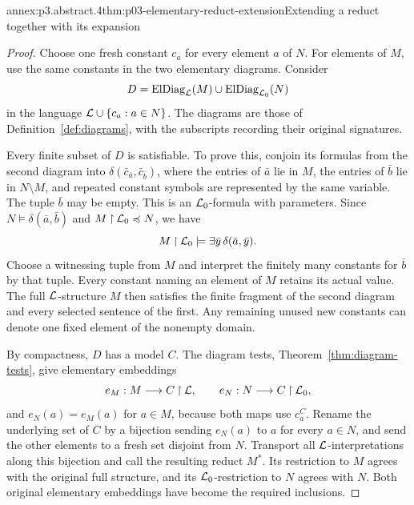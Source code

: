 \begin{annexitem}{annex:p3.abstract.4}{thm:p03-elementary-reduct-extension}{Extending a reduct together with its expansion}
\begin{proof}
Choose one fresh constant \(c_a\) for every element \(a\) of \(N\).
For elements of \(M\), use the same constants in the two elementary
diagrams.  Consider
\[
 D=\operatorname{ElDiag}_{\mathcal{L}}(M)
        \cup\operatorname{ElDiag}_{\mathcal{L}_0}(N)
\]
in the language \(\mathcal{L}\cup\{c_a:a\in N\}\).
The diagrams are those of Definition~\ref{def:diagrams}, with the
subscripts recording their original signatures.

Every finite subset of \(D\) is satisfiable.  To prove this, conjoin
its formulas from the second diagram into
\(\delta(\bar c_{\bar a},\bar c_{\bar b})\), where the entries of
\(\bar a\) lie in \(M\), the entries of \(\bar b\) lie in \(N\setminus M\),
and repeated constant symbols are represented by the same variable.
The tuple \(\bar b\) may be empty.
This is an \(\mathcal{L}_0\)-formula with parameters.
Since \(N\models\delta(\bar a,\bar b)\) and
\(M\mathbin{\upharpoonright}\mathcal{L}_0\preccurlyeq N\), we have
\[
 M\mathbin{\upharpoonright}\mathcal{L}_0\models\exists\bar y\,\delta(\bar a,\bar y).
\]
Choose a witnessing tuple from \(M\) and interpret the finitely many
constants for \(\bar b\) by that tuple.
Every constant naming an element of \(M\) retains its actual value.
The full \(\mathcal{L}\)-structure \(M\) then satisfies the finite fragment
of the second diagram and every selected sentence of the first.
Any remaining unused new constants can denote one fixed element of
the nonempty domain.

By compactness, \(D\) has a model \(C\).
The diagram tests, Theorem~\ref{thm:diagram-tests}, give elementary
embeddings
\[
 e_M:M\longrightarrow C\mathbin{\upharpoonright}\mathcal{L},\qquad
 e_N:N\longrightarrow C\mathbin{\upharpoonright}\mathcal{L}_0,
\]
and \(e_N(a)=e_M(a)\) for \(a\in M\), because both maps use \(c_a^C\).
Rename the underlying set of \(C\) by a bijection sending \(e_N(a)\)
to \(a\) for every \(a\in N\), and send the other elements to a fresh
set disjoint from \(N\).  Transport all \(\mathcal{L}\)-interpretations
along this bijection and call the resulting reduct \(M^*\).
Its restriction to \(M\) agrees with the original full structure,
and its \(\mathcal{L}_0\)-restriction to \(N\) agrees with \(N\).
Both original elementary embeddings have become the required inclusions.
\end{proof}
\end{annexitem}

